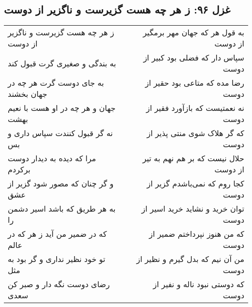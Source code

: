 \begin{center}
\section*{غزل ۹۶: ز هر چه هست گزیرست و ناگزیر از دوست}
\label{sec:096}
\begin{longtable}{l p{0.5cm} r}
ز هر چه هست گزیرست و ناگزیر از دوست
&&
به قول هر که جهان مهر برمگیر از دوست
\\
به بندگی و صغیری گرت قبول کند
&&
سپاس دار که فضلی بود کبیر از دوست
\\
به جای دوست گرت هر چه در جهان بخشند
&&
رضا مده که متاعی بود حقیر از دوست
\\
جهان و هر چه در او هست با نعیم بهشت
&&
نه نعمتیست که بازآورد فقیر از دوست
\\
نه گر قبول کنندت سپاس داری و بس
&&
که گر هلاک شوی منتی پذیر از دوست
\\
مرا که دیده به دیدار دوست برکردم
&&
حلال نیست که بر هم نهم به تیر از دوست
\\
و گر چنان که مصور شود گزیر از عشق
&&
کجا روم که نمی‌باشدم گزیر از دوست
\\
به هر طریق که باشد اسیر دشمن را
&&
توان خرید و نشاید خرید اسیر از دوست
\\
که در ضمیر من آید ز هر که در عالم
&&
که من هنوز نپرداختم ضمیر از دوست
\\
تو خود نظیر نداری و گر بود به مثل
&&
من آن نیم که بدل گیرم و نظیر از دوست
\\
رضای دوست نگه دار و صبر کن سعدی
&&
که دوستی نبود ناله و نفیر از دوست
\\
\end{longtable}
\end{center}

